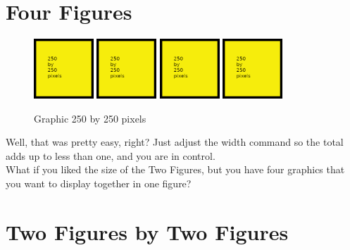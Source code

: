 \section{Four Figures}

\begin{figure}[H]
\centering
\includegraphics[width=0.2\textwidth]{250x250}
\includegraphics[width=0.2\textwidth]{250x250}
\includegraphics[width=0.2\textwidth]{250x250}
\includegraphics[width=0.2\textwidth]{250x250}
\caption{Graphic 250 by 250 pixels}\label{fg:250x250-5}
\end{figure}

Well, that was pretty easy, right?  Just adjust the width command so the total adds up to less than one, and you are in control.\\

What if you liked the size of the Two Figures, but you have four graphics that you want to display together in one figure?

\newpage

\section{Two Figures by Two Figures}

